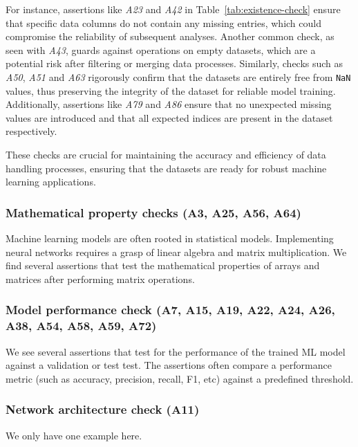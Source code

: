 For instance, assertions like \emph{A23} and \emph{A42} in Table~\ref{tab:existence-check} ensure that specific data columns do not contain any missing entries, which could compromise the reliability of subsequent analyses. Another common check, as seen with \emph{A43}, guards against operations on empty datasets, which are a potential risk after filtering or merging data processes. Similarly, checks such as \emph{A50}, \emph{A51} and \emph{A63} rigorously confirm that the datasets are entirely free from \texttt{NaN} values, thus preserving the integrity of the dataset for reliable model training. Additionally, assertions like \emph{A79} and \emph{A86} ensure that no unexpected missing values are introduced and that all expected indices are present in the dataset respectively.

These checks are crucial for maintaining the accuracy and efficiency of data handling processes, ensuring that the datasets are ready for robust machine learning applications.

\subsubsection{Mathematical property checks (A3, A25, A56, A64)}

Machine learning models are often rooted in statistical models. Implementing neural networks requires a grasp of linear algebra and matrix multiplication. We find several assertions that test the mathematical properties of arrays and matrices after performing matrix operations.

\subsubsection{Model performance check (A7, A15, A19, A22, A24, A26, A38, A54, A58, A59, A72)}

We see several assertions that test for the performance of the trained ML model against a validation or test test. The assertions often compare a performance metric (such as accuracy, precision, recall, F1, etc) against a predefined threshold.

\subsubsection{Network architecture check (A11)}

We only have one example here.

